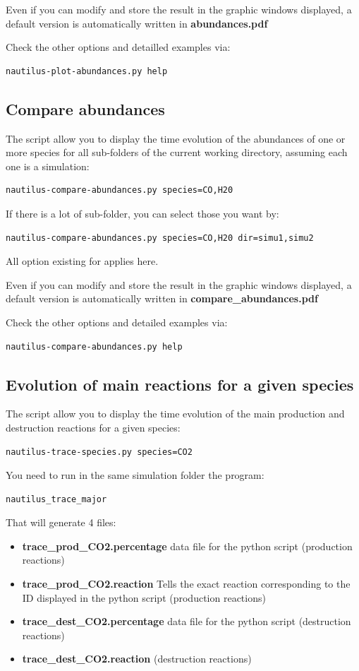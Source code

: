 \documentclass[english,a4paper,twoside]{article}
\begin{document}
Even if you can modify and store the result in the graphic windows displayed, a default version is automatically written in \textbf{abundances.pdf} 

Check the other options and detailled examples via:
\begin{verbatim}
nautilus-plot-abundances.py help
\end{verbatim}

\subsection{Compare abundances}
The script  allow you to display the time evolution of the abundances of one or more species for all sub-folders of the current working directory, assuming each one is a simulation:
\begin{verbatim}
nautilus-compare-abundances.py species=CO,H20
\end{verbatim}

If there is a lot of sub-folder, you can select those you want by:
\begin{verbatim}
nautilus-compare-abundances.py species=CO,H20 dir=simu1,simu2
\end{verbatim}

All option existing for  applies here.

Even if you can modify and store the result in the graphic windows displayed, a default version is automatically written in \textbf{compare\_abundances.pdf} 

Check the other options and detailed examples via:
\begin{verbatim}
nautilus-compare-abundances.py help
\end{verbatim}

\subsection{Evolution of main reactions for a given species}
The script  allow you to display the time evolution of the main production and destruction reactions for a given species:
\begin{verbatim}
nautilus-trace-species.py species=CO2
\end{verbatim}

You need to run in the same simulation folder the program:
\begin{verbatim}
nautilus_trace_major
\end{verbatim}
That will generate 4 files:
\begin{itemize}
\item \textbf{trace\_prod\_CO2.percentage} data file for the python script (production reactions)
\item \textbf{trace\_prod\_CO2.reaction} Tells the exact reaction corresponding to the ID displayed in the python script (production reactions)
\item \textbf{trace\_dest\_CO2.percentage} data file for the python script (destruction reactions)
\item \textbf{trace\_dest\_CO2.reaction} (destruction reactions)
\end{itemize}
\end{document}
